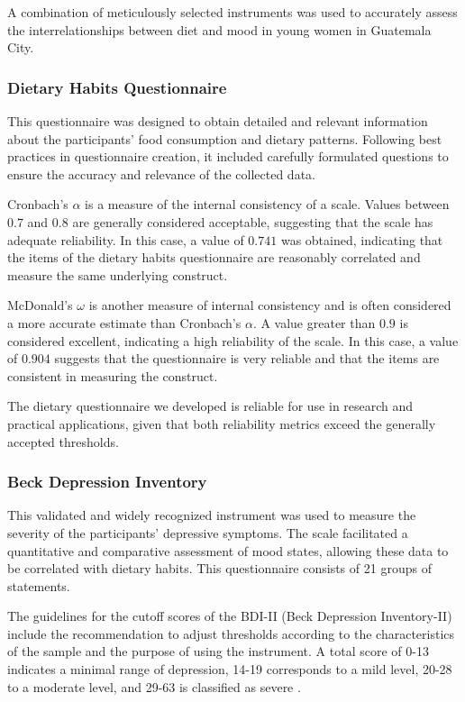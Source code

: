 \documentclass[jou]{apa7}
\begin{document}
A combination of meticulously selected instruments was used to accurately assess the interrelationships between diet and mood in young women in Guatemala City.

\subsubsection{Dietary Habits Questionnaire} This questionnaire was designed to obtain detailed and relevant information about the participants' food consumption and dietary patterns. Following best practices in questionnaire creation, it included carefully formulated questions to ensure the accuracy and relevance of the collected data.

Cronbach's $\alpha$ is a measure of the internal consistency of a scale. Values between $0.7$ and $0.8$ are generally considered acceptable, suggesting that the scale has adequate reliability. In this case, a value of $0.741$ was obtained, indicating that the items of the dietary habits questionnaire are reasonably correlated and measure the same underlying construct.

McDonald's $\omega$ is another measure of internal consistency and is often considered a more accurate estimate than Cronbach's $\alpha$. A value greater than $0.9$ is considered excellent, indicating a high reliability of the scale. In this case, a value of $0.904$ suggests that the questionnaire is very reliable and that the items are consistent in measuring the construct.

The dietary questionnaire we developed is reliable for use in research and practical applications, given that both reliability metrics exceed the generally accepted thresholds.


\subsubsection{Beck Depression Inventory} This validated and widely recognized instrument was used to measure the severity of the participants' depressive symptoms. The scale facilitated a quantitative and comparative assessment of mood states, allowing these data to be correlated with dietary habits. This questionnaire consists of 21 groups of statements.

The guidelines for the cutoff scores of the BDI-II (Beck Depression Inventory-II) include the recommendation to adjust thresholds according to the characteristics of the sample and the purpose of using the instrument. A total score of 0-13 indicates a minimal range of depression, 14-19 corresponds to a mild level, 20-28 to a moderate level, and 29-63 is classified as severe \parencite{beckBeckDepressionInventory2011}.
\end{document}
